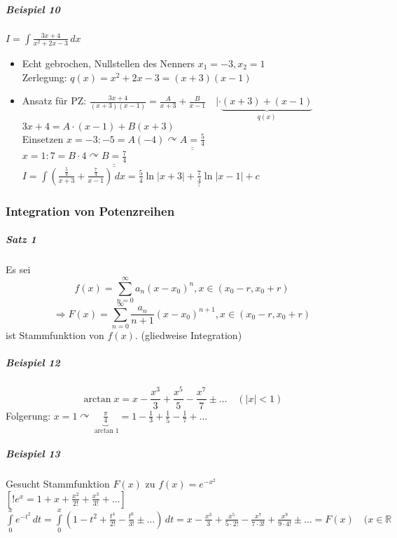 \documentclass[a4paper]{scrartcl}
\begin{document}
\subparagraph{Beispiel 10} $I = \int \frac{3x+4}{x^2+2x-3} \, dx$
\begin{itemize}
\item Echt gebrochen, Nullstellen des Nenners $x_1 = -3, x_2 = 1$\\
Zerlegung: $q(x) = x^2 +2x -3 = (x+3)(x-1)$
\item Ansatz für PZ: $\frac{3x+4}{(x+3)(x-1)} = \frac{A}{x+3} + \frac{B}{x-1} \quad | \cdot \underbrace{(x+3)+(x-1)}_{q(x)}$\\
$3x+4 = A \cdot (x-1) + B(x+3)$\\
Einsetzen $x=-3: -5 = A (-4) \curvearrowright \underline{\underline{A= \frac{5}{4}}}$\\
$x= 1: 7 = B \cdot 4 \curvearrowright \underline{\underline{ B = \frac{7}{4}}}$\\
$I = \int (\frac{\frac{5}{4}}{x+3} + \frac{\frac{7}{4}}{x-1} ) \, dx = \underline{\underline{\frac{5}{4} \ln{\lvert x + 3 \rvert} + \frac{7}{4} \ln{\lvert x -1 \rvert} +c}}$

\end{itemize}

\subsubsection{Integration von Potenzreihen}
\subparagraph{Satz 1} Es sei 
\[ f(x) = \sum\limits_{n=0}^{\infty} a_n(x-x_0)^n, x \in ( x_0 -r , x_0 +r)\]
\[ \Rightarrow F(x) = \sum\limits_{n=0}^{\infty} \frac{a_n}{n+1} (x - x_0)^{n+1}, x \in (x_0 -r, x_0 + r )\] ist Stammfunktion von $f(x)$. (gliedweise Integration)

\subparagraph{Beispiel 12}
\[ \arctan{x} = x - \frac{x^3}{3} + \frac{x^5}{5} - \frac{x^7}{7} \pm \dots \quad (\lvert x \rvert < 1)\]
Folgerung: $x=1 \curvearrowright \underbrace{\frac{\pi}{4}}_{\arctan{1}} = 1 - \frac{1}{3} + \frac{1}{5} - \frac{1}{7} + \dots$

\subparagraph{Beispiel 13} Gesucht Stammfunktion $F(x)$ zu $f(x) = e^{-x^2}$\\
$[ ! e^x = 1 + x + \frac{x^2}{2!} + \frac{x^3}{3!} + \dots ]$\\
$\int\limits_{0}^x e^{-t^2} \, dt = \int\limits_0^x (1-t^2 + \frac{t^4}{2!} - \frac{t^6}{3!} \pm \dots) \, dt = x-\frac{x^3}{3} + \frac{x^5}{5\cdot 2!} - \frac{x^7}{7\cdot 3!} + \frac{x^9}{9 \cdot 4!} \pm \dots = F(x) \quad (x \in \mathbb{R}$
\end{document}
